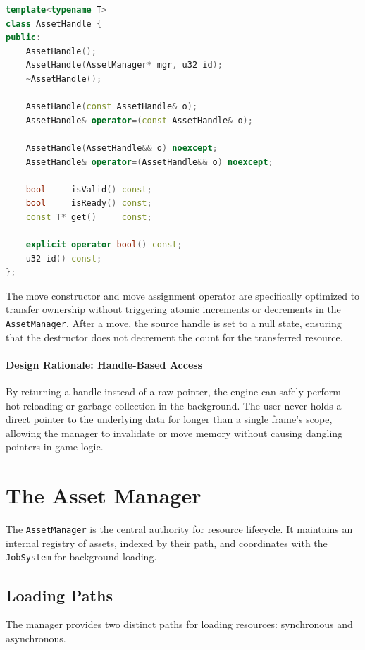 \begin{lstlisting}[language=C++, caption={AssetHandle interface}]
template<typename T>
class AssetHandle {
public:
    AssetHandle();
    AssetHandle(AssetManager* mgr, u32 id);
    ~AssetHandle();

    AssetHandle(const AssetHandle& o);
    AssetHandle& operator=(const AssetHandle& o);

    AssetHandle(AssetHandle&& o) noexcept;
    AssetHandle& operator=(AssetHandle&& o) noexcept;

    bool     isValid() const;
    bool     isReady() const;
    const T* get()     const;

    explicit operator bool() const;
    u32 id() const;
};
\end{lstlisting}

The move constructor and move assignment operator are specifically optimized to transfer ownership without triggering atomic increments or decrements in the \texttt{AssetManager}. After a move, the source handle is set to a null state, ensuring that the destructor does not decrement the count for the transferred resource.


\paragraph{Design Rationale: Handle-Based Access}
By returning a handle instead of a raw pointer, the engine can safely perform hot-reloading or garbage collection in the background. The user never holds a direct pointer to the underlying data for longer than a single frame's scope, allowing the manager to invalidate or move memory without causing dangling pointers in game logic.



\section{The Asset Manager}

The \texttt{AssetManager} is the central authority for resource lifecycle. It maintains an internal registry of assets, indexed by their path, and coordinates with the \texttt{JobSystem} for background loading.

\subsection{Loading Paths}

The manager provides two distinct paths for loading resources: synchronous and asynchronous.

